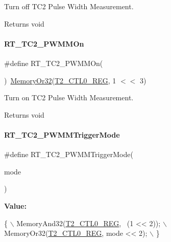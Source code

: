 Turn off T\+C2 Pulse Width Measurement. 

\begin{DoxyReturn}{Returns}
void 
\end{DoxyReturn}
\mbox{\label{a00047_a37ffb0b466d2a13bb9917a818b06776b}} 
\paragraph{\texorpdfstring{R\+T\+\_\+\+T\+C2\+\_\+\+P\+W\+M\+M\+On}{RT\_TC2\_PWMMOn}}
{\footnotesize\ttfamily \#define R\+T\+\_\+\+T\+C2\+\_\+\+P\+W\+M\+M\+On(\begin{DoxyParamCaption}{ }\end{DoxyParamCaption})~\mbox{\hyperlink{a00020_a27874a97deab7cecdde5ddecf466e31e}{Memory\+Or32}}(\mbox{\hyperlink{a00020_a5853553391e986211306d4f29ab31e47}{T2\+\_\+\+C\+T\+L0\+\_\+\+R\+EG}}, 1 $<$$<$ 3)}



Turn on T\+C2 Pulse Width Measurement. 

\begin{DoxyReturn}{Returns}
void 
\end{DoxyReturn}
\mbox{\label{a00047_a80f5ade258504a1243ccb058dd860475}} 
\paragraph{\texorpdfstring{R\+T\+\_\+\+T\+C2\+\_\+\+P\+W\+M\+M\+Trigger\+Mode}{RT\_TC2\_PWMMTriggerMode}}
{\footnotesize\ttfamily \#define R\+T\+\_\+\+T\+C2\+\_\+\+P\+W\+M\+M\+Trigger\+Mode(\begin{DoxyParamCaption}\item[{}]{mode }\end{DoxyParamCaption})}

{\bfseries Value\+:}
\begin{DoxyCode}
\{                                        \(\backslash\)
        MemoryAnd32(\mbox{\hyperlink{a00020_a5853553391e986211306d4f29ab31e47}{T2\_CTL0\_REG}}, ~(1 << 2)); \(\backslash\)
        MemoryOr32(\mbox{\hyperlink{a00020_a5853553391e986211306d4f29ab31e47}{T2\_CTL0\_REG}}, mode << 2);  \(\backslash\)
    \}
\end{DoxyCode}


